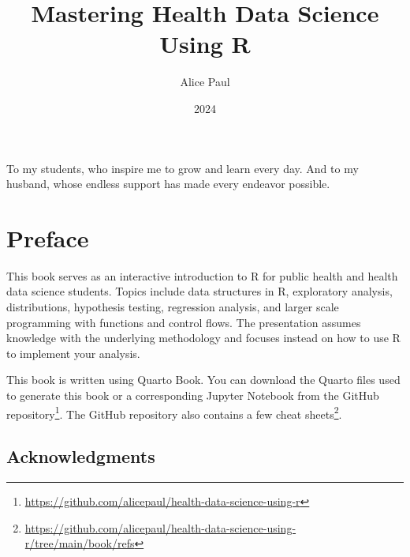 \documentclass[
  letterpaper,
]{latex/krantz}
\title{Mastering Health Data Science Using R}
\author{Alice Paul}
\date{2024}
\renewcommand{\href}[2]{#2\footnote{\url{#1}}}
\renewcommand*\contentsname{Table of contents}
\newcommand\contentsname{Table of contents}
\begin{document}
\maketitle


\thispagestyle{empty}

\begin{center}
To my students, who inspire me to grow and learn every day. And to my husband, whose endless support has made every endeavor possible.
\end{center}

\setlength{\abovedisplayskip}{-5pt}
\setlength{\abovedisplayshortskip}{-5pt}

\renewcommand*\contentsname{Table of contents}
{
\hypersetup{linkcolor=}
\setcounter{tocdepth}{2}
\tableofcontents
}

\chapter*{Preface}\label{preface}


This book serves as an interactive introduction to R for public health
and health data science students. Topics include data structures in R,
exploratory analysis, distributions, hypothesis testing, regression
analysis, and larger scale programming with functions and control flows.
The presentation assumes knowledge with the underlying methodology and
focuses instead on how to use R to implement your analysis.

This book is written using Quarto Book. You can download the Quarto
files used to generate this book or a corresponding Jupyter Notebook
from the
\href{https://github.com/alicepaul/health-data-science-using-r}{GitHub
repository}. The GitHub repository also contains a few
\href{https://github.com/alicepaul/health-data-science-using-r/tree/main/book/refs}{cheat
sheets}.

\section*{Acknowledgments}\label{acknowledgments}
\end{document}
